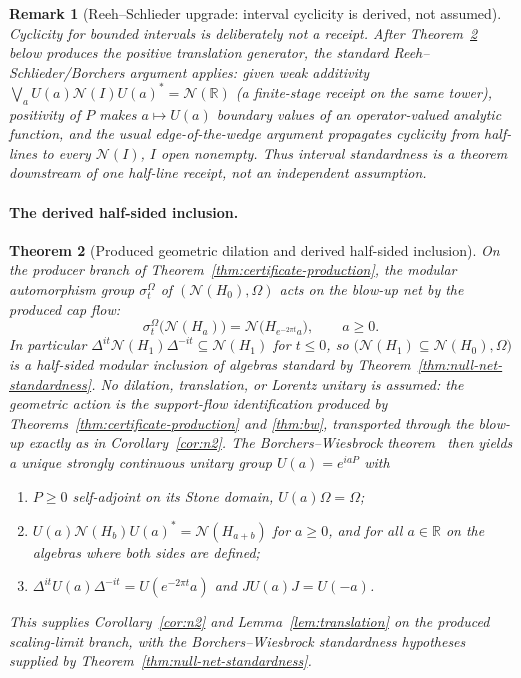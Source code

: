 \documentclass[11pt]{article}
\newtheorem{theorem}{Theorem}[section]
\newtheorem{remark}[theorem]{Remark}
\begin{document}
\begin{remark}[Reeh--Schlieder upgrade: interval cyclicity is derived, not assumed]
\label{rem:reeh-schlieder-upgrade}
Cyclicity for \emph{bounded} intervals is deliberately not a receipt. After
Theorem~\ref{thm:derived-hsm-production} below produces the positive
translation generator, the standard Reeh--Schlieder/Borchers argument applies:
given weak additivity
\(\bigvee_{a}U(a)\mathcal N(I)U(a)^{*}=\mathcal N(\mathbb R)\) (a finite-stage
receipt on the same tower), positivity of \(P\) makes
\(a\mapsto U(a)\) boundary values of an operator-valued analytic function, and
the usual edge-of-the-wedge argument propagates cyclicity from half-lines to
every \(\mathcal N(I)\), \(I\) open nonempty. Thus interval standardness is a
theorem downstream of one half-line receipt, not an independent assumption.
\end{remark}

\paragraph{The derived half-sided inclusion.}

\begin{theorem}[Produced geometric dilation and derived half-sided inclusion]
\label{thm:derived-hsm-production}
On the producer branch of Theorem~\ref{thm:certificate-production}, the
modular automorphism group \(\sigma^{\Omega}_t\) of
\((\mathcal N(H_0),\Omega)\) acts on the blow-up net by the produced cap flow:
\[
\sigma^{\Omega}_t\bigl(\mathcal N(H_a)\bigr)=\mathcal N\bigl(H_{e^{-2\pi t}a}\bigr),
\qquad a\geq0 .
\]
In particular \(\Delta^{it}\mathcal N(H_1)\Delta^{-it}\subseteq\mathcal N(H_1)\)
for \(t\leq0\), so \(\bigl(\mathcal N(H_1)\subseteq\mathcal N(H_0),\Omega\bigr)\)
is a half-sided modular inclusion of algebras standard by
Theorem~\ref{thm:null-net-standardness}. No dilation, translation, or Lorentz
unitary is assumed: the geometric action is the support-flow identification
produced by Theorems~\ref{thm:certificate-production} and \ref{thm:bw},
transported through the blow-up exactly as in Corollary~\ref{cor:n2}. The
Borchers--Wiesbrock theorem~\cite{wiesbrock93,arakiZsido05} then yields a
unique strongly continuous unitary group \(U(a)=e^{iaP}\) with
\begin{enumerate}[leftmargin=2em]
\item \(P\geq0\) self-adjoint on its Stone domain, \(U(a)\Omega=\Omega\);
\item \(U(a)\mathcal N(H_b)U(a)^{*}=\mathcal N(H_{a+b})\) for \(a\geq 0\), and
for all \(a\in\mathbb R\) on the algebras where both sides are defined;
\item \(\Delta^{it}U(a)\Delta^{-it}=U(e^{-2\pi t}a)\) and \(JU(a)J=U(-a)\).
\end{enumerate}
This supplies Corollary~\ref{cor:n2} and Lemma~\ref{lem:translation} on the
produced scaling-limit branch, with the Borchers--Wiesbrock standardness
hypotheses supplied by Theorem~\ref{thm:null-net-standardness}.
\end{theorem}
\end{document}
